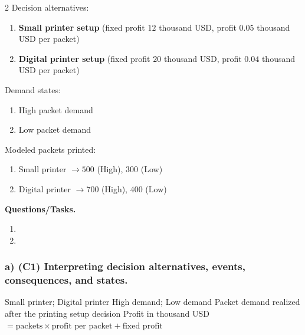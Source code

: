 	\begin{multicols}{2}
		Decision alternatives:
		\begin{enumerate}[label=\arabic*.]
			\item \textbf{Small printer setup} (fixed profit $12$ thousand USD, profit $0.05$ thousand USD per packet)
			\item \textbf{Digital printer setup} (fixed profit $20$ thousand USD, profit $0.04$ thousand USD per packet)
		\end{enumerate}
	
		Demand states:
		\begin{enumerate}[label=\arabic*.]
			\item High packet demand
			\item Low packet demand
		\end{enumerate}
	
			\columnbreak
	
		Modeled packets printed:
		\begin{enumerate}[label=\arabic*.]
			\item Small printer $\to 500$ (High), $300$ (Low)
			\item Digital printer $\to 700$ (High), $400$ (Low)
		\end{enumerate}
	\end{multicols}

	\textbf{Questions/Tasks.}
	\begin{enumerate}[label=\textbf{\alph*)}]
		\item {}
		\item {}
	\end{enumerate}
	
	\subsubsection*{a) \textbf{(C1)} Interpreting decision alternatives, events, consequences, and states.}
	\label{subsec:problem18-local-printing-contracts-c1}
	\DecisionElementsTable
	{Small printer; Digital printer}
	{High demand; Low demand}
	{Packet demand realized after the printing setup decision}
	{Profit in thousand USD $= \text{packets} \times \text{profit per packet} + \text{fixed profit}$}
	
	
